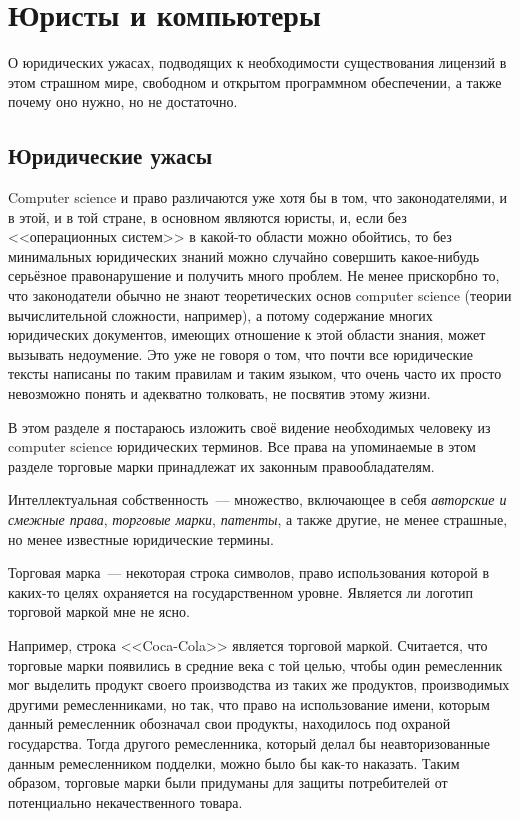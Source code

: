 \chapter{Юристы и компьютеры}

О юридических ужасах, подводящих к необходимости существования лицензий в этом страшном мире, свободном и открытом программном обеспечении, а также почему оно нужно, но не достаточно.

\section{Юридические ужасы}

Computer science и право различаются уже хотя бы в том, что законодателями, и в этой, и в той стране, в основном являются юристы, и, если без <<операционных систем>> в какой-то области можно обойтись, то без минимальных юридических знаний можно случайно совершить какое-нибудь серьёзное правонарушение и получить много проблем.
Не менее прискорбно то, что законодатели обычно не знают теоретических основ computer science (теории вычислительной сложности, например), а потому содержание многих юридических документов, имеющих отношение к этой области знания, может вызывать недоумение.
Это уже не говоря о том, что почти все юридические тексты написаны по таким правилам и таким языком, что очень часто их просто невозможно понять и адекватно толковать, не посвятив этому жизни.

В этом разделе я постараюсь изложить своё видение необходимых человеку из computer science юридических терминов.
Все права на упоминаемые в этом разделе торговые марки принадлежат их законным правообладателям.

\begin{definition}
Интеллектуальная собственность~--- множество, включающее в себя \emph{авторские и смежные права}, \emph{торговые марки}, \emph{патенты}, а также другие, не менее страшные, но менее известные юридические термины.
\end{definition}

\begin{definition}
Торговая марка~--- некоторая строка символов, право использования которой в каких-то целях охраняется на государственном уровне. Является ли логотип торговой маркой мне не ясно.
\end{definition}

Например, строка <<Coca-Cola>> является торговой маркой.
Считается, что торговые марки появились в средние века с той целью, чтобы один ремесленник мог выделить продукт своего производства из таких же продуктов, производимых другими ремесленниками, но так, что право на использование имени, которым данный ремесленник обозначал свои продукты, находилось под охраной государства.
Тогда другого ремесленника, который делал бы неавторизованные данным ремесленником подделки, можно было бы как-то наказать.
Таким образом, торговые марки были придуманы для защиты потребителей от потенциально некачественного товара.

